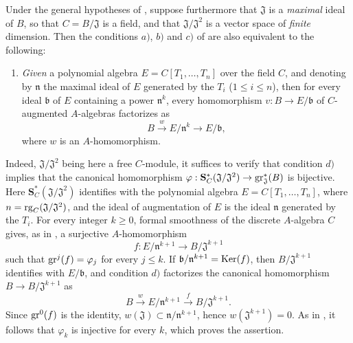 \begin{remark}[19.5.5]
\label{0.19.5.5}
Under the general hypotheses of , suppose furthermore that $\mathfrak{J}$ is a \emph{maximal} ideal of $B$, so that $C=B/\mathfrak{J}$ is a field, and that $\mathfrak{J}/\mathfrak{J}^2$ is a vector space of \emph{finite} dimension.
Then the conditions $a)$, $b)$ and $c)$ of  are also equivalent to the following:
\begin{enumerate}
  \item[d)] \emph{Given} a polynomial algebra $E=C[T_1,\ldots,T_n]$ over the field $C$, and denoting by $\mathfrak{n}$ the maximal ideal of $E$ generated by the $T_i$ ($1\leq i\leq n$), then for every ideal $\mathfrak{b}$ of $E$ containing a power $\mathfrak{n}^k$, every homomorphism $v:B\to E/\mathfrak{b}$ of $C$-augmented $A$-algebras factorizes as
  \[
    B\xrightarrow{w}E/\mathfrak{n}^k\to E/\mathfrak{b},
  \]
  where $w$ is an $A$-homomorphism.
\end{enumerate}
Indeed, $\mathfrak{J}/\mathfrak{J}^2$ being here a free $C$-module, it suffices to verify that condition $d)$ implies that the canonical homomorphism
$\varphi:\mathbf{S}_C^*(\mathfrak{J}/\mathfrak{J}^2)\to\operatorname{gr}_\mathfrak{J}^*(B)$
is bijective.
Here $\mathbf{S}_C^*(\mathfrak{J}/\mathfrak{J}^2)$ identifies with the polynomial algebra $E=C[T_1,\ldots,T_n]$, where $n=\operatorname{rg}_C(\mathfrak{J}/\mathfrak{J}^2)$, and the ideal of augmentation of $E$ is the ideal $\mathfrak{n}$ generated by the $T_i$.
For every integer $k\geq 0$, formal smoothness of the discrete $A$-algebra $C$ gives, as in , a surjective $A$-homomorphism
\[
  f:E/\mathfrak{n}^{k+1}\to B/\mathfrak{J}^{k+1}
\]
such that $\operatorname{gr}^j(f)=\varphi_j$ for every $j\leq k$.
If $\mathfrak{b}/\mathfrak{n}^{k+1}=\operatorname{Ker}(f)$, then $B/\mathfrak{J}^{k+1}$ identifies with $E/\mathfrak{b}$, and condition $d)$ factorizes the canonical homomorphism $B\to B/\mathfrak{J}^{k+1}$ as
\[
  B\xrightarrow{w}E/\mathfrak{n}^{k+1}
  \xrightarrow{f}B/\mathfrak{J}^{k+1}.
\]
Since $\operatorname{gr}^0(f)$ is the identity, $w(\mathfrak{J})\subset\mathfrak{n}/\mathfrak{n}^{k+1}$, hence $w(\mathfrak{J}^{k+1})=0$.
As in , it follows that $\varphi_k$ is injective for every $k$, which proves the assertion.
\end{remark}

